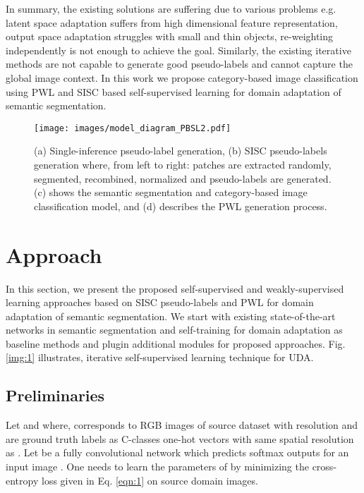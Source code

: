 \documentclass[10pt,twocolumn,letterpaper]{article}
\begin{document}
In summary, the existing solutions are suffering due to various problems e.g. latent space adaptation suffers from high dimensional feature representation, output space adaptation struggles with small and thin objects, re-weighting independently is not enough to achieve the goal. Similarly, the existing iterative methods are not capable to generate good pseudo-labels and cannot capture the global image context. In this work we propose category-based image classification using PWL and SISC based self-supervised learning for domain adaptation of semantic segmentation. 
\begin{figure*}[t]
	\centering
	\texttt{[image: images/model\_diagram\_PBSL2.pdf]}
	\caption{(a) Single-inference pseudo-label generation, (b) SISC pseudo-labels generation where, from left to right: patches are extracted randomly, segmented, recombined, normalized and pseudo-labels are generated. (c) shows the semantic segmentation and category-based image classification model, and (d) describes the PWL generation process.}
	\label{img:2}
	\vspace{-0.5cm}
\end{figure*}
\section{Approach}
\label{sec:method}
In this section, we present the proposed self-supervised and weakly-supervised learning approaches based on SISC pseudo-labels and PWL for domain adaptation of semantic segmentation. We start with existing state-of-the-art networks in semantic segmentation \cite{wu2019Resnet38} and self-training for domain adaptation \cite{zou2018unsupervised} as baseline methods and plugin additional modules for proposed approaches.
Fig. \ref{img:1} illustrates, iterative self-supervised learning technique for UDA.

\subsection{Preliminaries}
Let  and  where,  corresponds to RGB images of source dataset with resolution  and  are ground truth labels as C-classes one-hot vectors with same spatial resolution as . Let  be a fully convolutional network which predicts softmax outputs  for an input image . One needs to learn the parameters  of  by minimizing the cross-entropy loss given in Eq. \ref{eqn:1} on source domain images.
\vspace{-0.2cm}
\end{document}
